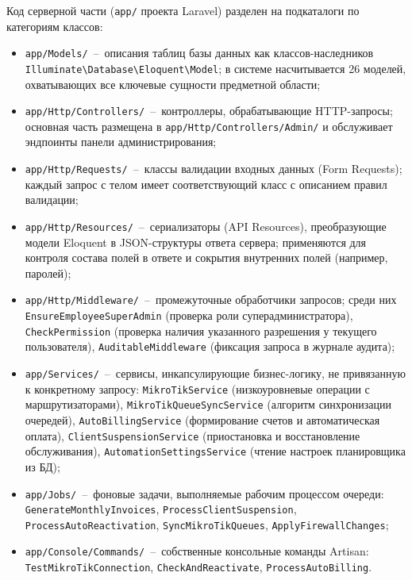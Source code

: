 Код серверной части (\texttt{app/} проекта Laravel) разделен на подкаталоги по категориям классов:
\begin{itemize}
\item \texttt{app/Models/}~--~описания таблиц базы данных как классов-наследников \texttt{Illuminate\textbackslash Database\textbackslash Eloquent\textbackslash Model}; в системе насчитывается 26 моделей, охватывающих все ключевые сущности предметной области;
\item \texttt{app/Http/Controllers/}~--~контроллеры, обрабатывающие HTTP-запросы; основная часть размещена в \texttt{app/Http/Controllers/Admin/} и обслуживает эндпоинты панели администрирования;
\item \texttt{app/Http/Requests/}~--~классы валидации входных данных (Form Requests); каждый запрос с телом имеет соответствующий класс с описанием правил валидации;
\item \texttt{app/Http/Resources/}~--~сериализаторы (API Resources), преобразующие модели Eloquent в JSON-структуры ответа сервера; применяются для контроля состава полей в ответе и сокрытия внутренних полей (например, паролей);
\item \texttt{app/Http/Middleware/}~--~промежуточные обработчики запросов; среди них \texttt{EnsureEmployeeSuperAdmin} (проверка роли суперадминистратора), \texttt{CheckPermission} (проверка наличия указанного разрешения у текущего пользователя), \texttt{AuditableMiddleware} (фиксация запроса в журнале аудита);
\item \texttt{app/Services/}~--~сервисы, инкапсулирующие бизнес-логику, не привязанную к конкретному запросу: \texttt{MikroTikService} (низкоуровневые операции с маршрутизаторами), \texttt{MikroTikQueueSyncService} (алгоритм синхронизации очередей), \texttt{AutoBillingService} (формирование счетов и автоматическая оплата), \texttt{ClientSuspensionService} (приостановка и восстановление обслуживания), \texttt{AutomationSettingsService} (чтение настроек планировщика из БД);
\item \texttt{app/Jobs/}~--~фоновые задачи, выполняемые рабочим процессом очереди: \texttt{GenerateMonthlyInvoices}, \texttt{ProcessClientSuspension}, \texttt{ProcessAutoReactivation}, \texttt{SyncMikroTikQueues}, \texttt{ApplyFirewallChanges};
\item \texttt{app/Console/Commands/}~--~собственные консольные команды Artisan: \texttt{TestMikroTikConnection}, \texttt{CheckAndReactivate}, \texttt{ProcessAutoBilling}.
\end{itemize}

